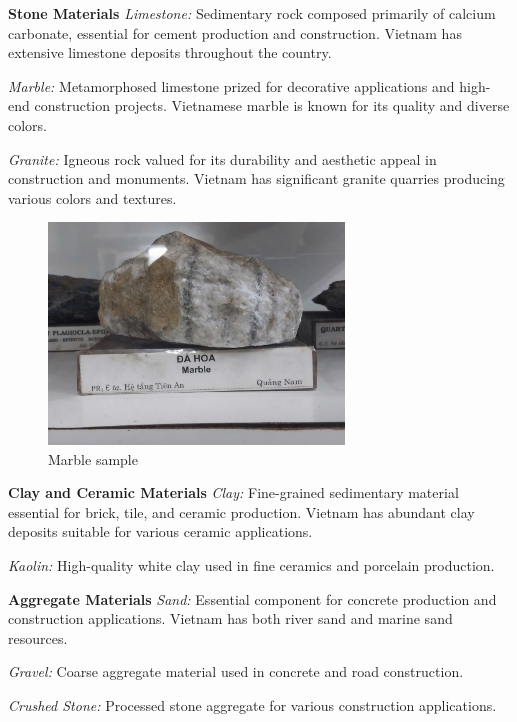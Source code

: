 \textbf{Stone Materials}
\textit{Limestone:} Sedimentary rock composed primarily of calcium carbonate, essential for cement production and construction. Vietnam has extensive limestone deposits throughout the country.

\textit{Marble:} Metamorphosed limestone prized for decorative applications and high-end construction projects. Vietnamese marble is known for its quality and diverse colors.

\textit{Granite:} Igneous rock valued for its durability and aesthetic appeal in construction and monuments. Vietnam has significant granite quarries producing various colors and textures.

\begin{figure}[H]
\centering
\includegraphics[width=0.7\textwidth]{graphics/stone_materials.png}
\caption{Marble sample}
\label{fig:stone_materials}
\end{figure}

\textbf{Clay and Ceramic Materials}
\textit{Clay:} Fine-grained sedimentary material essential for brick, tile, and ceramic production. Vietnam has abundant clay deposits suitable for various ceramic applications.

\textit{Kaolin:} High-quality white clay used in fine ceramics and porcelain production.


\textbf{Aggregate Materials}
\textit{Sand:} Essential component for concrete production and construction applications. Vietnam has both river sand and marine sand resources.

\textit{Gravel:} Coarse aggregate material used in concrete and road construction.

\textit{Crushed Stone:} Processed stone aggregate for various construction applications.


